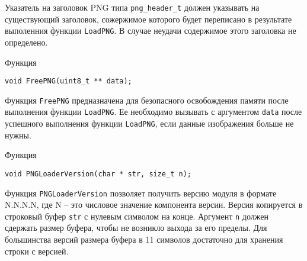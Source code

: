 \documentclass[a4paper,12pt]{article}
\begin{document}
Указатель на заголовок PNG типа \texttt{png\_header\_t} должен указывать на существующий заголовок, сожержимое которого будет переписано в результате выполенния функции \texttt{LoadPNG}. В случае неудачи содержимое этого заголовка не определено.

Функция

\leftskip=1.5cm
\texttt{void FreePNG(uint8\_t ** data);}

\leftskip=0cm
Функция \texttt{FreePNG} предназначена для безопасного освобождения памяти после выполнения функции \texttt{LoadPNG}. Ее необходимо вызывать с аргументом \texttt{data} после успешного выполнения функции \texttt{LoadPNG}, если данные изображения больше не нужны.

Функция

\leftskip=1.5cm
\texttt{void PNGLoaderVersion(char * str, size\_t n);}

\leftskip=0cm
Функция \texttt{PNGLoaderVersion} позволяет получить версию модуля в формате N.N.N.N, где N -- это числовое значение компонента версии. Версия копируется в строковый буфер \texttt{str} с нулевым символом на конце. Аргумент \texttt{n} должен сдержать размер буфера, чтобы не возникло выхода за его пределы. Для большинства версий размера буфера в 11 символов достаточно для хранения строки с версией.
\end{document}
